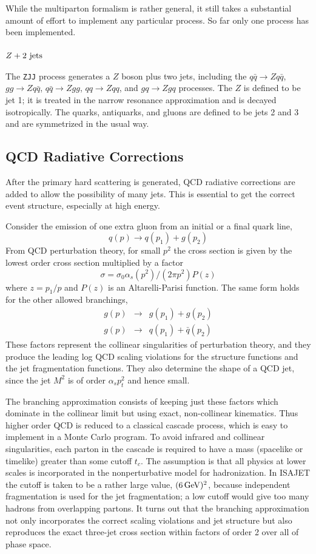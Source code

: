       While the multiparton formalism is rather general, it still takes
a substantial amount of effort to implement any particular process. So
far only one process has been implemented.

\subsubsection{$Z + {\rm 2\ jets}$} The \verb|ZJJ| process generates a
$Z$ boson plus two jets, including the $q\bar{q} \to Z q \bar{q}$, $gg
\to Z q\bar{q}$, $q\bar{q} \to Zgg$, $qq \to Zqq$, and $gq \to Z gq$
processes. The $Z$ is defined to be jet 1; it is treated in the narrow
resonance approximation and is decayed isotropically. The quarks,
antiquarks, and gluons are defined to be jets 2 and 3 and are
symmetrized in the usual way.

\subsection{QCD Radiative Corrections\label{qcdshower}}

      After the primary hard scattering is generated, QCD radiative
corrections are added to allow the possibility of many jets. This is
essential to get the correct event structure, especially at high
energy.

      Consider the emission of one extra gluon from an initial or a
final quark line,
$$
q(p) \to q(p_1) + g(p_2)
$$
From QCD perturbation theory, for small $p^2$ the cross section is
given by the lowest order cross section multiplied by a factor
$$
\sigma = \sigma_0  \alpha_s(p^2)/(2\pi p^2) P(z)
$$
where $z=p_1/p$ and $P(z)$ is an Altarelli-Parisi function. The same
form holds for the other allowed branchings,
\begin{eqnarray*}
g(p) &\to& g(p_1) + g(p_2) \\
g(p) &\to& q(p_1) + \bar q(p_2)
\end{eqnarray*}
These factors represent the collinear singularities of perturbation
theory, and they produce the leading log QCD scaling violations for the
structure functions and the jet fragmentation functions. They also
determine the shape of a QCD jet, since the jet $M^2$ is of order
$\alpha_s p_t^2$ and hence small.

      The branching approximation consists of keeping just these
factors which dominate in the collinear limit but using exact,
non-collinear kinematics. Thus higher order QCD is reduced to a
classical cascade process, which is easy to implement in a Monte Carlo
program. To avoid infrared and collinear singularities, each parton in
the cascade is required to have a mass (spacelike or timelike) greater
than some cutoff $t_c$. The assumption is that all physics at lower
scales is incorporated in the nonperturbative model for hadronization.
In ISAJET the cutoff is taken to be a rather large value,
$(6\,{\rm GeV})^2$, because independent fragmentation is used for the jet 
fragmentation; a low cutoff would give too many hadrons from
overlapping partons. It turns out that the branching approximation not
only incorporates the correct scaling violations and jet structure but
also reproduces the exact three-jet cross section within factors of
order 2 over all of phase space.

